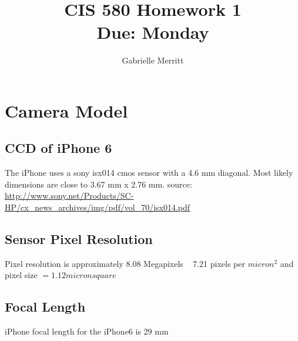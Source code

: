 \documentclass[11pt,english]{article}
\title{CIS 580 Homework 1 \\
Due: Monday}
\author{Gabrielle Merritt}
\date{}
\begin{document}
\maketitle
\section*{ Camera Model }
\subsection*{CCD of iPhone 6}
The iPhone uses a sony isx014 cmos sensor with a 4.6 mm diagonal. Most likely dimensions are close to 3.67 mm x  2.76 mm.
\linebreak source: \url{ http://www.sony.net/Products/SC-HP/cx_news_archives/img/pdf/vol_70/isx014.pdf}
\subsection*{Sensor Pixel Resolution}
Pixel resolution is approximately 8.08 Megapixels ~ 7.21 pixels per $micron^2$
and pixel size $ =1.12 micron square$ 
\subsection*{Focal Length}
iPhone focal length for the iPhone6 is 29 mm
\end{document}
